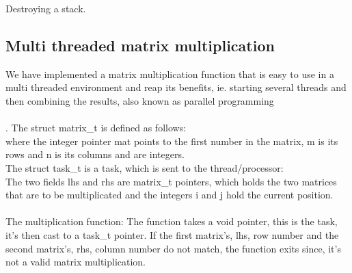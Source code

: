         {Destroying a stack.}

\subsection{Multi threaded matrix multiplication}
We have implemented a matrix multiplication function that is easy to use in a
multi threaded environment and reap its benefits, ie. starting several threads
and then combining the results, also known as parallel programming\\
\\.
The \textsf{struct matrix\_t} is defined as follows:\\
where the integer pointer \textsf{mat} points to the first number in the matrix,
\textsf{m} is its rows and \textsf{n} is its columns and are integers.\\
The \textsf{struct task\_t} is a task, which is sent to the thread/processor:\\
The two fields \textsf{lhs} and \textsf{rhs} are matrix\_t pointers, which holds the two
matrices that are to be multiplicated and the integers \textsf{i} and \textsf{j} hold
the current position.\\
\\
The multiplication function:
The function takes a void pointer, this is the task, it's then cast to a task\_t
pointer. If the first matrix's, lhs, row number and the second matrix's, rhs,
column number do not match, the function exits since, it's not a valid matrix
multiplication.

